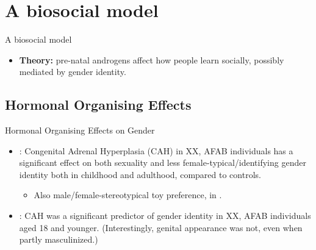 \documentclass[hyperref={pdfpagelabels=false}]{beamer}
\begin{document}

\section{A biosocial model}

\begin{frame}{A biosocial model}
	\begin{itemize}
	\item[ ] \textbf{Theory:} pre-natal androgens affect how people learn socially, possibly mediated by gender identity.
	\end{itemize}

\end{frame}




\subsection{Hormonal Organising Effects}

\begin{frame}{Hormonal Organising Effects on Gender}
\begin{itemize}
	\item \citet{hinesetal2004}: Congenital Adrenal Hyperplasia (CAH) in XX, AFAB individuals has a significant effect on both sexuality and less female-typical/identifying gender identity both in childhood and adulthood, compared to controls.
	\begin{itemize}
	\item Also male/female-stereotypical toy preference, in \citet{pasterskietal2005}.
	\end{itemize}
	\item \citet{berenbaumbailey2003}: CAH was a significant predictor of gender identity in XX, AFAB individuals aged 18 and younger. (Interestingly, genital appearance was not, even when partly masculinized.)

\end{itemize}
\end{frame}
\end{document}
